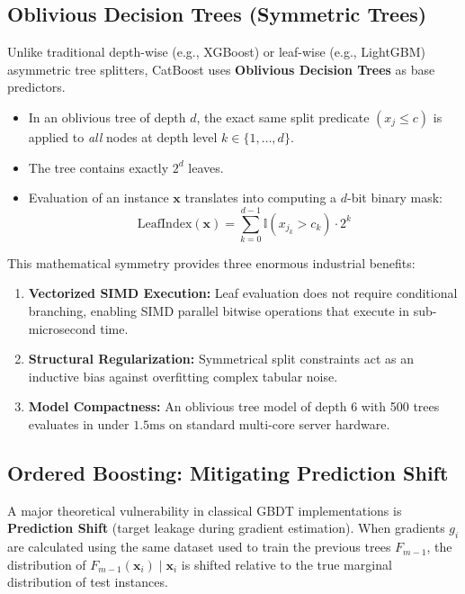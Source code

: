 \documentclass[11pt,a4paper]{article}
\begin{document}
\subsection{Oblivious Decision Trees (Symmetric Trees)}
Unlike traditional depth-wise (e.g., XGBoost) or leaf-wise (e.g., LightGBM) asymmetric tree splitters, CatBoost uses \textbf{Oblivious Decision Trees} as base predictors.
\begin{itemize}[leftmargin=*]
    \item In an oblivious tree of depth $d$, the exact same split predicate $(x_j \le c)$ is applied to \textit{all} nodes at depth level $k \in \{1, \dots, d\}$.
    \item The tree contains exactly $2^d$ leaves.
    \item Evaluation of an instance $\mathbf{x}$ translates into computing a $d$-bit binary mask:
    \begin{equation}
        \text{LeafIndex}(\mathbf{x}) = \sum_{k=0}^{d-1} \mathbb{I}(x_{j_k} > c_k) \cdot 2^k
    \end{equation}
\end{itemize}
This mathematical symmetry provides three enormous industrial benefits:
\begin{enumerate}
    \item \textbf{Vectorized SIMD Execution:} Leaf evaluation does not require conditional branching, enabling SIMD parallel bitwise operations that execute in sub-microsecond time.
    \item \textbf{Structural Regularization:} Symmetrical split constraints act as an inductive bias against overfitting complex tabular noise.
    \item \textbf{Model Compactness:} An oblivious tree model of depth 6 with 500 trees evaluates in under $1.5\text{ms}$ on standard multi-core server hardware.
\end{enumerate}

\subsection{Ordered Boosting: Mitigating Prediction Shift}
A major theoretical vulnerability in classical GBDT implementations is \textbf{Prediction Shift} (target leakage during gradient estimation). When gradients $g_i$ are calculated using the same dataset used to train the previous trees $F_{m-1}$, the distribution of $F_{m-1}(\mathbf{x}_i) \mid \mathbf{x}_i$ is shifted relative to the true marginal distribution of test instances.
\end{document}
